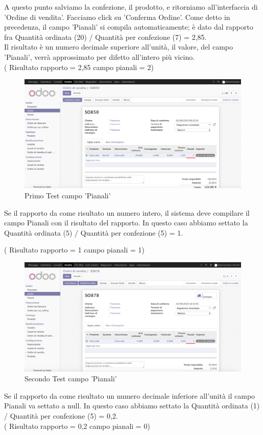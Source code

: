 \newpage
A questo punto salviamo la confezione, il prodotto, e ritorniamo all'interfaccia di 'Ordine di vendita'.
Facciamo click su 'Conferma Ordine'. Come detto in precedenza, il campo 'Pianali' si compila automaticamente; è dato dal rapporto fra Quantità ordinata (20) / Quantità per confezione (7) = 2,85.\\
Il risultato è un numero decimale superiore all'unità, il valore, del campo 'Pianali', verrà approssimato per difetto all'intero più vicino.\\
( Risultato rapporto = 2,85 campo pianali = 2)

\begin{figure}[H]
	\begin{center} \includegraphics[scale=0.3]{figures/fifth_test}
		\caption[Primo Test campo 'Pianali']{Primo Test campo 'Pianali'}
		\label{fig:fifth_test}
	\end{center}
\end{figure}
\newpage
Se il rapporto da come risultato un numero intero, il sistema deve compilare il campo Pianali con il risultato del rapporto.
In questo caso abbiamo settato la Quantità ordinata (5) / Quantità per confezione (5) = 1.

( Risultato rapporto = 1 campo pianali = 1)
\begin{figure}[H]
	\begin{center} \includegraphics[scale=0.3]{figures/sixth_test}
		\caption[Secondo Test campo 'Pianali']{Secondo Test campo 'Pianali'}
		\label{fig:sixth_test}
	\end{center}
\end{figure}
\newpage
Se il rapporto da come risultato un numero decimale inferiore all'unità il campo Pianali va settato a null.
In questo caso abbiamo settato la Quantità ordinata (1) / Quantità per confezione (5) = 0,2.\\
( Risultato rapporto = 0,2 campo pianali = 0)

